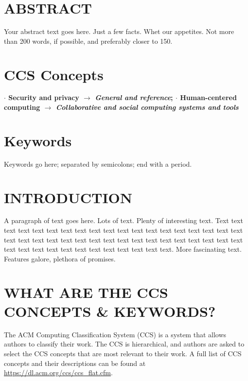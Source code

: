 \documentclass[letterpaper,twocolumn,draft]{article}
\begin{document}
\section*{\MakeUppercase{Abstract}}
Your abstract text goes here. Just a few facts. Whet our appetites.
Not more than 200 words, if possible, and preferably closer to 150.
\lipsum[1-2]

\section*{\textbf{CCS Concepts}}
\textbf{
    $\cdot$ Security and privacy $\rightarrow$ \textit{General and reference};
    $\cdot$ Human-centered computing $\rightarrow$ \textit{Collaborative and 
    social computing systems and tools}}

\section*{\textbf{Keywords}}
Keywords go here; separated by semicolons; end with a period.

\section{\MakeUppercase{Introduction}}
A paragraph of text goes here. Lots of text. Plenty of interesting
text. Text text text text text text text text text text text text text
text text text text text text text text text text text text text text
text text text text text text text text text text text text text text
text text text text text text text.
More fascinating text. Features galore, plethora of promises.

\section{\MakeUppercase{What are the CCS Concepts \& Keywords?}}
The ACM Computing Classification System (CCS) is a system that allows authors 
to classify their work. The CCS is hierarchical, and authors are asked to 
select the CCS concepts that are most relevant to their work. A full list 
of CCS concepts and their descriptions can be found at 
\url{https://dl.acm.org/ccs/ccs_flat.cfm}.
\end{document}
